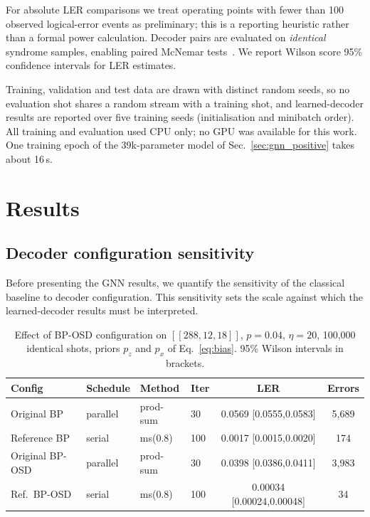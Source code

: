 \documentclass[a4paper,twocolumn,11pt,nopdfoutputerror]{quantumarticle}
\newcommand{\code}[3]{\ensuremath{[\![#1,#2,#3]\!]}}
\begin{document}
For absolute LER comparisons we treat operating points with fewer than
100 observed logical-error events as preliminary; this is a reporting
heuristic rather than a formal power calculation. Decoder pairs are
evaluated on \emph{identical} syndrome samples, enabling paired
McNemar tests~\cite{McNemar1947}. We report Wilson score 95\% confidence
intervals for LER estimates.

Training, validation and test data are drawn with distinct random
seeds, so no evaluation shot shares a random stream with a training
shot, and learned-decoder results are reported over five training seeds
(initialisation and minibatch order). All training and evaluation used
CPU only; no GPU was available for this work. One training epoch of the
39k-parameter model of Sec.~\ref{sec:gnn_positive} takes about 16\,s.

\section{Results}\label{sec:results}

\subsection{Decoder configuration sensitivity}\label{sec:baseline}

Before presenting the GNN results, we quantify the sensitivity of the
classical baseline to decoder configuration. This sensitivity sets the
scale against which the learned-decoder results must be interpreted.

\begin{table}[t]
\centering
\caption{Effect of BP-OSD configuration on $\code{288}{12}{18}$,
         $p=0.04$, $\eta=20$, 100{,}000 identical shots, priors $p_z$ and
         $p_x$ of Eq.~\eqref{eq:bias}. 95\% Wilson intervals in brackets.}
\label{tab:smoking_gun}
\begin{tabular}{@{}llllcc@{}}
\toprule
Config & Schedule & Method & Iter & LER & Errors \\
\midrule
Original BP     & parallel & prod-sum & 30  & 0.0569 [0.0555,0.0583] & 5{,}689 \\
Reference BP    & serial   & ms(0.8)  & 100 & 0.0017 [0.0015,0.0020] &    174 \\
Original BP-OSD & parallel & prod-sum & 30  & 0.0398 [0.0386,0.0411] & 3{,}983 \\
Ref.\ BP-OSD    & serial   & ms(0.8)  & 100 & 0.00034 [0.00024,0.00048] &   34 \\
\bottomrule
\end{tabular}
\end{table}
\end{document}
